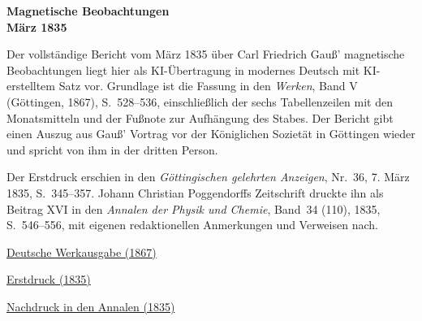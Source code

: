 \clearpage
\thispagestyle{empty}
\begin{center}\Large\textbf{Magnetische Beobachtungen\\März 1835}\end{center}

Der vollständige Bericht vom März 1835 über Carl Friedrich Gauß’ magnetische Beobachtungen liegt hier als KI-Übertragung in modernes Deutsch mit KI-erstelltem Satz vor. Grundlage ist die Fassung in den \textit{Werken}, Band V (Göttingen, 1867), S.~528--536, einschließlich der sechs Tabellenzeilen mit den Monatsmitteln und der Fußnote zur Aufhängung des Stabes. Der Bericht gibt einen Auszug aus Gauß’ Vortrag vor der Königlichen Sozietät in Göttingen wieder und spricht von ihm in der dritten Person.

Der Erstdruck erschien in den \textit{Göttingischen gelehrten Anzeigen}, Nr.~36, 7. März 1835, S.~345--357. Johann Christian Poggendorffs Zeitschrift druckte ihn als Beitrag XVI in den \textit{Annalen der Physik und Chemie}, Band~34 (110), 1835, S.~546--556, mit eigenen redaktionellen Anmerkungen und Verweisen nach.

\medskip\noindent
\href{https://gdz.sub.uni-goettingen.de/id/PPN236006339}{Deutsche Werkausgabe (1867)}\par
\noindent\href{https://www.digitale-sammlungen.de/view/bsb10538708?page=351}{Erstdruck (1835)}\par
\noindent\href{https://www.digitale-sammlungen.de/view/bsb10130347?page=558}{Nachdruck in den Annalen (1835)}
\clearpage
